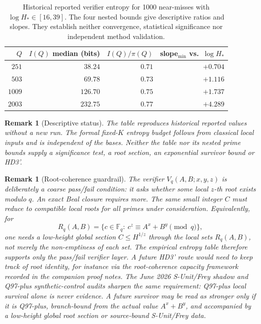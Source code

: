 \documentclass[11pt,a4paper]{article}
\newtheorem{remark}[theorem]{Remark}
\begin{document}
\begin{table}[htb]
\centering
\begin{tabular}{rrrr}
\toprule
$Q$ & $I(Q)$ median (bits) & $I(Q)/\pi(Q)$ & slope$_{\min}$ vs.\ $\log H_*$ \\
\midrule
$251$  & $38.24$  & $0.71$ & $+0.704$ \\
$503$  & $69.78$  & $0.73$ & $+1.116$ \\
$1009$ & $126.70$ & $0.75$ & $+1.737$ \\
$2003$ & $232.75$ & $0.77$ & $+4.289$ \\
\bottomrule
\end{tabular}
\caption{Historical reported verifier entropy for 1000 near-misses with $\log H_*\in[16,39]$. The four nested bounds give descriptive ratios and slopes. They establish neither convergence, statistical significance nor independent method validation.}
\label{tab:emp}
\end{table}

\begin{remark}[Descriptive status]
The table reproduces historical reported values without a new run.
The formal fixed-$K$ entropy budget follows from classical local
inputs and is independent of the bases. Neither the table nor its
nested prime bounds supply a significance test, a root section,
an exponential survivor bound or HD3'.
\end{remark}

\begin{remark}[Root-coherence guardrail]
The verifier $V_q(A,B;x,y,z)$ is deliberately a coarse pass/fail
condition: it asks whether some local $z$-th root exists modulo $q$.
An exact Beal closure requires more. The same small integer $C$ must
reduce to compatible local roots for all primes under consideration.
Equivalently, for
\[
  R_q(A,B)=\{c\in\mathbb F_q:\ c^z\equiv A^x+B^y\pmod q\},
\]
one needs a low-height global section $C\le H^{1/z}$ through the local
sets $R_q(A,B)$, not merely the non-emptiness of each set. The empirical
entropy table therefore supports only the pass/fail verifier layer. A
future HD3' route would need to keep track of root identity, for instance via the
root-coherence capacity framework recorded in the companion proof notes.
The June 2026 S-Unit/Frey shadow and Q97-plus synthetic-control audits
sharpen the same requirement: Q97-plus local survival alone is never
evidence. A future survivor may be read as stronger only if it is
Q97-plus, branch-bound from the actual value $A^x+B^y$, and accompanied
by a low-height global root section or source-bound S-Unit/Frey data.
\end{remark}
\end{document}
